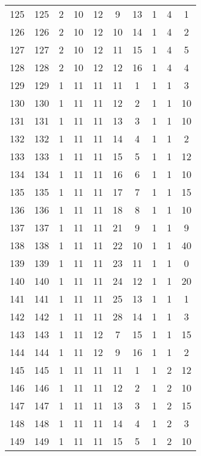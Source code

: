 \begin{longtable}{cccccccccc}
  125 & 125 &   2 &  10 &  12 &   9 &  13 &   1 &   4 &   1 \\ 
  126 & 126 &   2 &  10 &  12 &  10 &  14 &   1 &   4 &   2 \\ 
  127 & 127 &   2 &  10 &  12 &  11 &  15 &   1 &   4 &   5 \\ 
  128 & 128 &   2 &  10 &  12 &  12 &  16 &   1 &   4 &   4 \\ 
  129 & 129 &   1 &  11 &  11 &  11 &   1 &   1 &   1 &   3 \\ 
  130 & 130 &   1 &  11 &  11 &  12 &   2 &   1 &   1 &  10 \\ 
  131 & 131 &   1 &  11 &  11 &  13 &   3 &   1 &   1 &  10 \\ 
  132 & 132 &   1 &  11 &  11 &  14 &   4 &   1 &   1 &   2 \\ 
  133 & 133 &   1 &  11 &  11 &  15 &   5 &   1 &   1 &  12 \\ 
  134 & 134 &   1 &  11 &  11 &  16 &   6 &   1 &   1 &  10 \\ 
  135 & 135 &   1 &  11 &  11 &  17 &   7 &   1 &   1 &  15 \\ 
  136 & 136 &   1 &  11 &  11 &  18 &   8 &   1 &   1 &  10 \\ 
  137 & 137 &   1 &  11 &  11 &  21 &   9 &   1 &   1 &   9 \\ 
  138 & 138 &   1 &  11 &  11 &  22 &  10 &   1 &   1 &  40 \\ 
  139 & 139 &   1 &  11 &  11 &  23 &  11 &   1 &   1 &   0 \\ 
  140 & 140 &   1 &  11 &  11 &  24 &  12 &   1 &   1 &  20 \\ 
  141 & 141 &   1 &  11 &  11 &  25 &  13 &   1 &   1 &   1 \\ 
  142 & 142 &   1 &  11 &  11 &  28 &  14 &   1 &   1 &   3 \\ 
  143 & 143 &   1 &  11 &  12 &   7 &  15 &   1 &   1 &  15 \\ 
  144 & 144 &   1 &  11 &  12 &   9 &  16 &   1 &   1 &   2 \\ 
  145 & 145 &   1 &  11 &  11 &  11 &   1 &   1 &   2 &  12 \\ 
  146 & 146 &   1 &  11 &  11 &  12 &   2 &   1 &   2 &  10 \\ 
  147 & 147 &   1 &  11 &  11 &  13 &   3 &   1 &   2 &  15 \\ 
  148 & 148 &   1 &  11 &  11 &  14 &   4 &   1 &   2 &   3 \\ 
  149 & 149 &   1 &  11 &  11 &  15 &   5 &   1 &   2 &  10 \\ 

\end{longtable}
